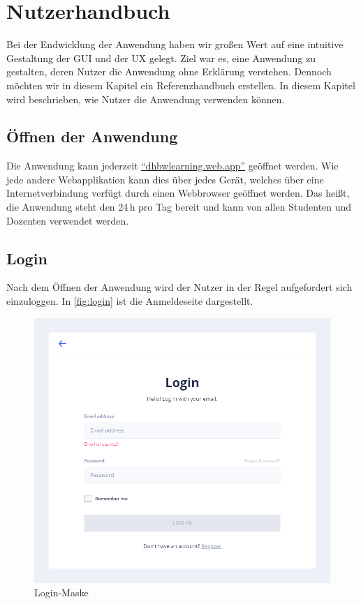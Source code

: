 \chapter{Nutzerhandbuch} %
Bei der Endwicklung der Anwendung haben wir großen Wert auf eine intuitive Gestaltung der \ac{GUI} und der \ac{UX} gelegt.
Ziel war es, eine Anwendung zu gestalten, deren Nutzer die Anwendung ohne Erklärung verstehen.
Dennoch möchten wir in diesem Kapitel ein Referenzhandbuch erstellen.
In diesem Kapitel wird beschrieben, wie Nutzer die Anwendung verwenden können.

\section{Öffnen der Anwendung}
Die Anwendung kann jederzeit \href{https://dhbwlearning.web.app}{\enquote{dhbwlearning.web.app}} geöffnet werden.
Wie jede andere Webapplikation kann dies über jedes Gerät, welches über eine Internetverbindung verfügt durch einen Webbrowser geöffnet werden.
Das heißt, die Anwendung steht den 24\,h pro Tag bereit und kann von allen Studenten und Dozenten verwendet werden.

\section{Login}
Nach dem Öffnen der Anwendung wird der Nutzer in der Regel aufgefordert sich einzuloggen.
In \autoref{fig:login} ist die Anmeldeseite dargestellt.

\begin{figure}[h]
    \centering
    \includegraphics[width=.7\textwidth]{img/Login}
    \caption{Login-Maske}
    \label{fig:login}
\end{figure}

